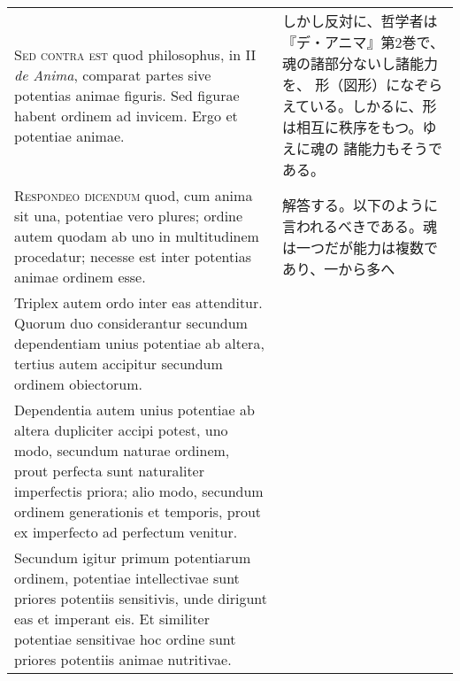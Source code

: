 \documentclass[paper=a4paper,fontsize=10pt,jafontsize=9pt,titlepage]{jlreq}
\begin{document}
\begin{longtable}{p{21em}p{21em}}
\\




 {\scshape Sed contra est} quod philosophus, in II {\itshape de
 Anima}, comparat partes sive potentias animae figuris. Sed figurae
 habent ordinem ad invicem. Ergo et potentiae animae.

 
&

しかし反対に、哲学者は『デ・アニマ』第2巻で、魂の諸部分ないし諸能力を、
形（図形）になぞらえている。しかるに、形は相互に秩序をもつ。ゆえに魂の
諸能力もそうである。

\\




 {\scshape Respondeo dicendum} quod, cum anima sit una, potentiae vero
 plures; ordine autem quodam ab uno in multitudinem procedatur;
 necesse est inter potentias animae ordinem esse.

 
&

解答する。以下のように言われるべきである。魂は一つだが能力は複数であり、一から多へ

\\


 Triplex autem ordo
 inter eas attenditur. Quorum duo considerantur secundum dependentiam
 unius potentiae ab altera, tertius autem accipitur secundum ordinem
 obiectorum.


 
&



\\


 Dependentia autem unius potentiae ab altera dupliciter
 accipi potest, uno modo, secundum naturae ordinem, prout perfecta
 sunt naturaliter imperfectis priora; alio modo, secundum ordinem
 generationis et temporis, prout ex imperfecto ad perfectum
 venitur.


 
&



\\


 Secundum igitur primum potentiarum ordinem, potentiae
 intellectivae sunt priores potentiis sensitivis, unde dirigunt eas et
 imperant eis. Et similiter potentiae sensitivae hoc ordine sunt
 priores potentiis animae nutritivae.


 
&



\\



\end{longtable}
\end{document}
